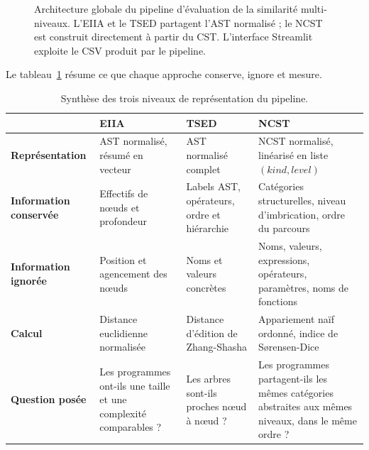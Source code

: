 \documentclass[12pt,a4paper,oneside]{report}
\begin{document}
\begin{figure}[htbp]
{%
}
\caption{Architecture globale du pipeline d'évaluation de la similarité
multi-niveaux. L'EIIA et le TSED partagent l'AST normalisé ; le NCST est
construit directement à partir du CST. L'interface Streamlit exploite le CSV
produit par le pipeline.}
\label{fig:architecture}
\end{figure}

Le tableau~\ref{tab:synthese} résume ce que chaque approche conserve, ignore
et mesure.

\begin{table}[htbp]
\centering
\small
\renewcommand{\arraystretch}{1.25}
\begin{tabularx}{\textwidth}{>{\bfseries}p{2.6cm}XXX}
\toprule
 & \textcolor{eiiacol}{EIIA} & \textcolor{tsedcol}{TSED} & \textcolor{ncstcol}{NCST} \\
\midrule
Représentation & AST normalisé, résumé en vecteur & AST normalisé complet &
  NCST normalisé, linéarisé en liste $(\mathit{kind},\mathit{level})$ \\
Information conservée & Effectifs de nœuds et profondeur &
  Labels AST, opérateurs, ordre et hiérarchie &
  Catégories structurelles, niveau d'imbrication, ordre du parcours \\
Information ignorée & Position et agencement des nœuds &
  Noms et valeurs concrètes &
  Noms, valeurs, expressions, opérateurs, paramètres, noms de fonctions \\
Calcul & Distance euclidienne normalisée &
  Distance d'édition de Zhang-Shasha &
  Appariement naïf ordonné, indice de Sørensen-Dice \\
Question posée & Les programmes ont-ils une taille et une complexité
  comparables ? & Les arbres sont-ils proches nœud à nœud ? &
  Les programmes partagent-ils les mêmes catégories abstraites aux mêmes
  niveaux, dans le même ordre ? \\
\bottomrule
\end{tabularx}
\caption{Synthèse des trois niveaux de représentation du pipeline.}
\label{tab:synthese}
\end{table}
\end{document}
